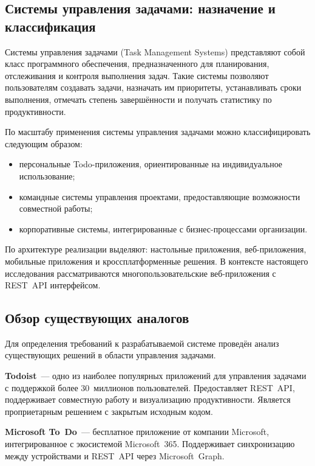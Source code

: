 \documentclass[a4paper,14pt]{extarticle}
\begin{document}
\subsection{Системы управления задачами: назначение и классификация}

Системы управления задачами (Task Management Systems) представляют собой класс программного обеспечения, предназначенного для планирования, отслеживания и контроля выполнения задач. Такие системы позволяют пользователям создавать задачи, назначать им приоритеты, устанавливать сроки выполнения, отмечать степень завершённости и получать статистику по продуктивности.

По масштабу применения системы управления задачами можно классифицировать следующим образом:

\begin{itemize}[leftmargin=1.25cm, itemsep=0pt]
  \item[---] персональные Todo-приложения, ориентированные на индивидуальное использование;
  \item[---] командные системы управления проектами, предоставляющие возможности совместной работы;
  \item[---] корпоративные системы, интегрированные с бизнес-процессами организации.
\end{itemize}

По архитектуре реализации выделяют: настольные приложения, веб-приложения, мобильные приложения и кроссплатформенные решения. В контексте настоящего исследования рассматриваются многопользовательские веб-приложения с REST~API интерфейсом.

\subsection{Обзор существующих аналогов}

Для определения требований к разрабатываемой системе проведён анализ существующих решений в области управления задачами.

\textbf{Todoist}~--- одно из наиболее популярных приложений для управления задачами с поддержкой более 30~миллионов пользователей. Предоставляет REST~API, поддерживает совместную работу и визуализацию продуктивности. Является проприетарным решением с закрытым исходным кодом.

\textbf{Microsoft To~Do}~--- бесплатное приложение от компании Microsoft, интегрированное с экосистемой Microsoft~365. Поддерживает синхронизацию между устройствами и REST~API через Microsoft~Graph.
\end{document}
